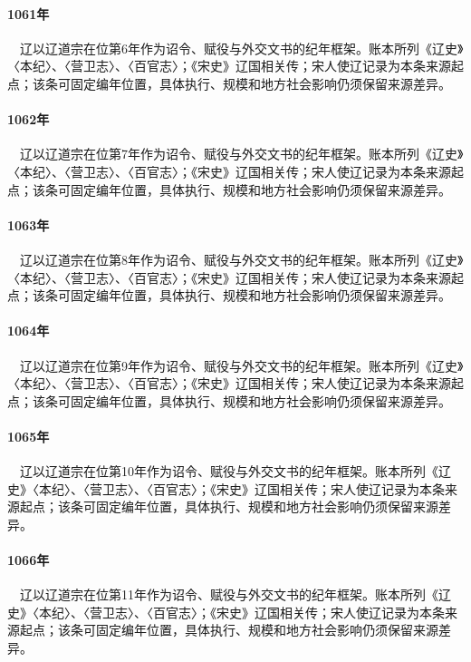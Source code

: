 \paragraph{1061年}　辽以辽道宗在位第6年作为诏令、赋役与外交文书的纪年框架。账本所列《辽史》〈本纪〉、〈营卫志〉、〈百官志〉；《宋史》辽国相关传；宋人使辽记录为本条来源起点；该条可固定编年位置，具体执行、规模和地方社会影响仍须保留来源差异。

\paragraph{1062年}　辽以辽道宗在位第7年作为诏令、赋役与外交文书的纪年框架。账本所列《辽史》〈本纪〉、〈营卫志〉、〈百官志〉；《宋史》辽国相关传；宋人使辽记录为本条来源起点；该条可固定编年位置，具体执行、规模和地方社会影响仍须保留来源差异。

\paragraph{1063年}　辽以辽道宗在位第8年作为诏令、赋役与外交文书的纪年框架。账本所列《辽史》〈本纪〉、〈营卫志〉、〈百官志〉；《宋史》辽国相关传；宋人使辽记录为本条来源起点；该条可固定编年位置，具体执行、规模和地方社会影响仍须保留来源差异。

\paragraph{1064年}　辽以辽道宗在位第9年作为诏令、赋役与外交文书的纪年框架。账本所列《辽史》〈本纪〉、〈营卫志〉、〈百官志〉；《宋史》辽国相关传；宋人使辽记录为本条来源起点；该条可固定编年位置，具体执行、规模和地方社会影响仍须保留来源差异。

\paragraph{1065年}　辽以辽道宗在位第10年作为诏令、赋役与外交文书的纪年框架。账本所列《辽史》〈本纪〉、〈营卫志〉、〈百官志〉；《宋史》辽国相关传；宋人使辽记录为本条来源起点；该条可固定编年位置，具体执行、规模和地方社会影响仍须保留来源差异。

\paragraph{1066年}　辽以辽道宗在位第11年作为诏令、赋役与外交文书的纪年框架。账本所列《辽史》〈本纪〉、〈营卫志〉、〈百官志〉；《宋史》辽国相关传；宋人使辽记录为本条来源起点；该条可固定编年位置，具体执行、规模和地方社会影响仍须保留来源差异。

